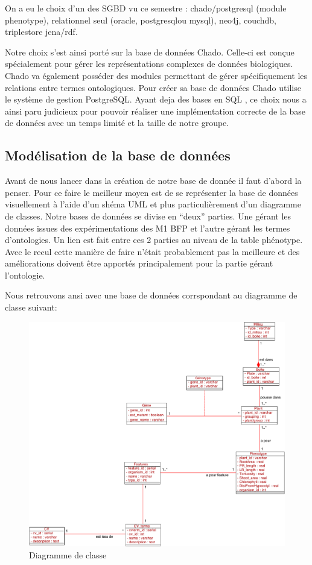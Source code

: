 \documentclass[11pt,french,]{article}
\begin{document}
On a eu le choix d'un des SGBD vu ce semestre : chado/postgresql (module
phenotype), relationnel seul (oracle, postgresqlou mysql), neo4j,
couchdb, triplestore jena/rdf.

Notre choix s'est ainsi porté sur la base de données Chado. Celle-ci est
conçue spécialement pour gérer les représentations complexes de données
biologiques. Chado va également posséder des modules permettant de gérer
spécifiquement les relations entre termes ontologiques. Pour créer sa
base de données Chado utilise le système de gestion PostgreSQL. Ayant
deja des bases en SQL , ce choix nous a ainsi paru judicieux pour
pouvoir réaliser une implémentation correcte de la base de données avec
un temps limité et la taille de notre groupe.

\hypertarget{modelisation-de-la-base-de-donnees}{%
\subsection{Modélisation de la base de
données}\label{modelisation-de-la-base-de-donnees}}

Avant de nous lancer dans la création de notre base de donnée il faut
d'abord la penser. Pour ce faire le meilleur moyen est de se représenter
la base de données visuellement à l'aide d'un shéma UML et plus
particulièrement d'un diagramme de classes. Notre bases de données se
divise en ``deux'' parties. Une gérant les données issues des
expérimentations des M1 BFP et l'autre gérant les termes d'ontologies.
Un lien est fait entre ces 2 parties au niveau de la table phénotype.
Avec le recul cette manière de faire n'était probablement pas la
meilleure et des améliorations doivent être apportés principalement pour
la partie gérant l'ontologie.

Nous retrouvons ansi avec une base de données corrspondant au diagramme
de classe suivant:

\begin{figure}[h]
 \centering
 \includegraphics{../img/class_diagram.pdf}
 \caption{Diagramme de classe}
\end{figure}
\end{document}
